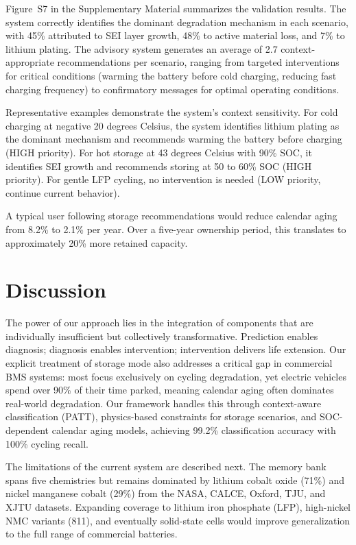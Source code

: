 \documentclass[5p,times,authoryear]{elsarticle}
\begin{document}
Figure~S7 in the Supplementary Material summarizes the validation results. The system correctly identifies the dominant degradation mechanism in each scenario, with 45\% attributed to SEI layer growth, 48\% to active material loss, and 7\% to lithium plating. The advisory system generates an average of 2.7 context-appropriate recommendations per scenario, ranging from targeted interventions for critical conditions (warming the battery before cold charging, reducing fast charging frequency) to confirmatory messages for optimal operating conditions.

Representative examples demonstrate the system's context sensitivity. For cold charging at negative 20 degrees Celsius, the system identifies lithium plating as the dominant mechanism and recommends warming the battery before charging (HIGH priority). For hot storage at 43 degrees Celsius with 90\% SOC, it identifies SEI growth and recommends storing at 50 to 60\% SOC (HIGH priority). For gentle LFP cycling, no intervention is needed (LOW priority, continue current behavior).

A typical user following storage recommendations would reduce calendar aging from 8.2\% to 2.1\% per year. Over a five-year ownership period, this translates to approximately 20\% more retained capacity.


\section{Discussion}

The power of our approach lies in the integration of components that are individually insufficient but collectively transformative. Prediction enables diagnosis; diagnosis enables intervention; intervention delivers life extension. Our explicit treatment of storage mode also addresses a critical gap in commercial BMS systems: most focus exclusively on cycling degradation, yet electric vehicles spend over 90\% of their time parked, meaning calendar aging often dominates real-world degradation. Our framework handles this through context-aware classification (PATT), physics-based constraints for storage scenarios, and SOC-dependent calendar aging models, achieving 99.2\% classification accuracy with 100\% cycling recall.

The limitations of the current system are described next. The memory bank spans five chemistries but remains dominated by lithium cobalt oxide (71\%) and nickel manganese cobalt (29\%) from the NASA, CALCE, Oxford, TJU, and XJTU datasets. Expanding coverage to lithium iron phosphate (LFP), high-nickel NMC variants (811), and eventually solid-state cells would improve generalization to the full range of commercial batteries.
\end{document}
